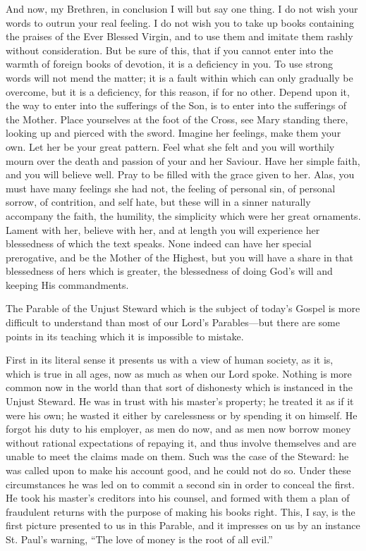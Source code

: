 And now, my Brethren, in conclusion I will but
say one thing. I do not wish your words to outrun your real feeling. I
do not wish you to take up books containing the praises of the Ever
Blessed Virgin, and to use them and imitate them rashly without
consideration. But be sure of this, that if you cannot enter into the
warmth of foreign books of devotion, it is a deficiency in you. To use
strong words will not mend the matter; it is a fault within which can
only gradually be overcome, but it is a deficiency, for this reason,
if for no other. Depend upon it, the way to enter into the sufferings
of the Son, is to enter into the sufferings of the Mother. Place
yourselves at the foot of the Cross, see Mary standing there, looking
up and pierced with the sword. Imagine her feelings, make them your
own. Let her be your great pattern. Feel what she felt and you will
worthily mourn over the death and passion of your and her Saviour.
Have her simple faith, and you will believe well. Pray to be filled
with the grace given to her. Alas, you must have many feelings she had
not, the feeling of personal sin, of personal sorrow, of contrition,
and self hate, but these will in a sinner naturally accompany the
faith, the humility, the simplicity which were her great
ornaments. Lament with her, believe with her, and at length you will
experience her blessedness of which the text speaks. None indeed can
have her special prerogative, and be the Mother of the Highest, but
you will have a share in that blessedness of hers which is greater,
the blessedness of doing God's will and keeping His commandments.



The Parable of the Unjust Steward which is
the subject of today's Gospel is more difficult to understand than
most of our Lord's Parables—but there are some points in its
teaching which it is impossible to mistake.

First in its literal sense it presents us with a
view of human society, as it is, which is true in all ages, now as
much as when our Lord spoke. Nothing is more common now in the world
than that sort of dishonesty which is instanced in the Unjust Steward.
He was in trust with his master's property; he treated it as if it
were his own; he wasted it either by carelessness or by spending it on
himself. He forgot his duty to his employer, as men do now, and as men
now borrow money without rational expectations of repaying it, and
thus involve themselves and are unable to meet the claims made on
them. Such was the case of the Steward: he was called upon to make his
account good, and he could not do so. Under these circumstances he was
led on to commit a second sin in order to conceal the first. He
took his master's creditors into his counsel, and formed with them a
plan of fraudulent returns with the purpose of making his books right.
This, I say, is the first picture presented to us in this Parable, and
it impresses on us by an instance St. Paul's warning, ``The love
of money is the root of all evil.''

